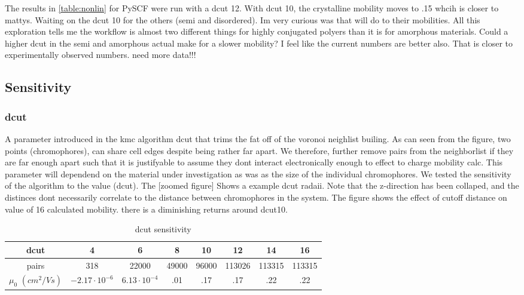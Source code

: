 The results in \ref{table:nonlin} for PySCF were run with a dcut 12. With dcut 10, the crystalline mobility
moves to .15 whcih is closer to mattys. Waiting on the dcut 10 for the others (semi and disordered). Im very
curious was that will do to their mobilities. All this exploration tells me the workflow is almost two
different things for highly conjugated polyers than it is for amorphous materials. Could a higher dcut in the
semi and amorphous actual make for a slower mobility? I feel like the current numbers are better also. That is
closer to experimentally observed numbers. need more data!!!


\subsection{Sensitivity}

\subsubsection{dcut}

A parameter introduced in the kmc algorithm dcut that trims the fat off of the voronoi neighlist builing.
As can seen from the figure, two points (chromophores), can share cell edges despite being rather far apart. We
therefore, further remove pairs from the neighborlist if they are far enough apart such that it is justifyable
to assume they dont interact electronically enough to effect to charge mobility calc. This parameter will
dependend on the material under investigation as was as the size of the individual chromophores. We tested the
sensitivity of the algorithm to the value (dcut). The [zoomed figure] Shows a example dcut radaii. Note that
the z-direction has been collaped, and the distinces dont necessarily correlate to the distance
between chromophores in the system. The figure shows the effect of cutoff distance on value of
16 calculated mobility. there is a diminishing returns around dcut10.


\begin{table}[ht]
\caption{dcut sensitivity}
\centering %
\begin{tabular}{c c c c c c c c} %
\hline\hline %
dcut & 4 & 6 & 8 & 10 & 12 & 14 & 16 \\ [0.5ex] %
\hline  %
pairs & 318 & 22000 & 49000 & 96000 & 113026 & 113315 & 113315 \\ [1ex]%
$\mu_{0}$ $(cm^{2}/Vs)$ & $-2.17 \cdot 10^{-6}$ & $6.13 \cdot 10^{-4}$ & .01 & .17 & .17 & .22 & .22 \\ [1ex] %
\hline %
\end{tabular}
\label{table:dcut-sense} %
\end{table}

